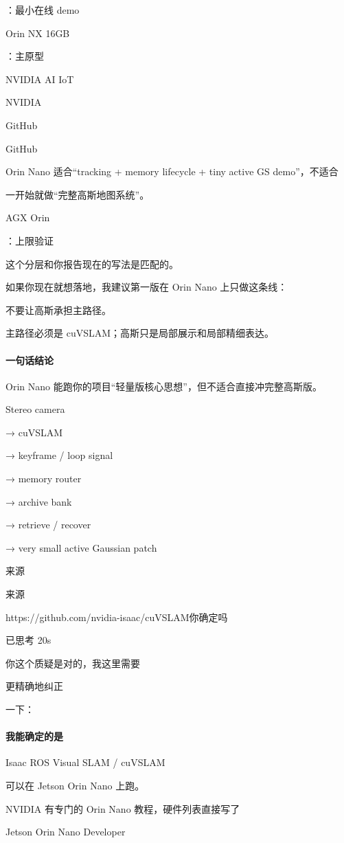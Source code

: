 \documentclass[12pt]{article}
\begin{document}
：最小在线 demo

Orin NX 16GB

：主原型

NVIDIA AI IoT

NVIDIA

GitHub

GitHub

Orin Nano 适合“tracking + memory lifecycle + tiny active GS demo”，不适合

一开始就做“完整高斯地图系统”。

AGX Orin

：上限验证

这个分层和你报告现在的写法是匹配的。

如果你现在就想落地，我建议第一版在 Orin Nano 上只做这条线：

不要让高斯承担主路径。

主路径必须是 cuVSLAM；高斯只是局部展示和局部精细表达。

\paragraph{一句话结论}
Orin Nano 能跑你的项目“轻量版核心思想”，但不适合直接冲完整高斯版。

Stereo camera

→ cuVSLAM

→ keyframe / loop signal

→ memory router

→ archive bank

→ retrieve / recover

→ very small active Gaussian patch

来源

来源

https://github.com/nvidia-isaac/cuVSLAM你确定吗

已思考 20s

你这个质疑是对的，我这里需要

更精确地纠正

一下：

\paragraph{我能确定的是}
Isaac ROS Visual SLAM / cuVSLAM

可以在 Jetson Orin Nano 上跑。

NVIDIA 有专门的 Orin Nano 教程，硬件列表直接写了

Jetson Orin Nano Developer
\end{document}
